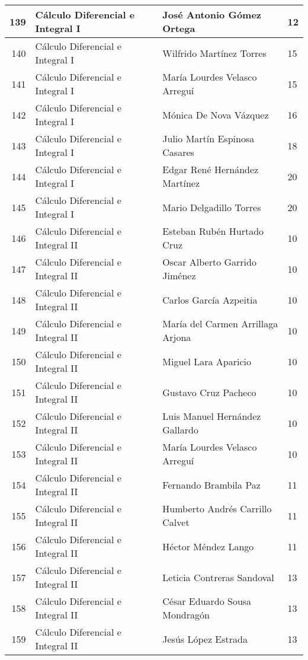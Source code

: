 \begin{table}[ht]
\begin{tabular}{rlll}
  139 & Cálculo Diferencial e Integral I & José Antonio Gómez Ortega & 12 \\ \hline
  140 & Cálculo Diferencial e Integral I & Wilfrido Martínez Torres & 15 \\ \hline
  141 & Cálculo Diferencial e Integral I & María Lourdes Velasco Arreguí & 15 \\ \hline
  142 & Cálculo Diferencial e Integral I & Mónica De Nova Vázquez & 16 \\ \hline
  143 & Cálculo Diferencial e Integral I & Julio Martín Espinosa Casares & 18 \\ \hline
  144 & Cálculo Diferencial e Integral I & Edgar René Hernández Martínez & 20 \\ \hline
  145 & Cálculo Diferencial e Integral I & Mario Delgadillo Torres & 20 \\ \hline
  146 & Cálculo Diferencial e Integral II & Esteban Rubén Hurtado Cruz & 10 \\ \hline
  147 & Cálculo Diferencial e Integral II & Oscar Alberto Garrido Jiménez & 10 \\ \hline
  148 & Cálculo Diferencial e Integral II & Carlos García Azpeitia & 10 \\ \hline
  149 & Cálculo Diferencial e Integral II & María del Carmen Arrillaga Arjona & 10 \\ \hline
  150 & Cálculo Diferencial e Integral II & Miguel Lara Aparicio & 10 \\ \hline
  151 & Cálculo Diferencial e Integral II & Gustavo Cruz Pacheco & 10 \\ \hline
  152 & Cálculo Diferencial e Integral II & Luis Manuel Hernández Gallardo & 10 \\ \hline
  153 & Cálculo Diferencial e Integral II & María Lourdes Velasco Arreguí & 10 \\ \hline
  154 & Cálculo Diferencial e Integral II & Fernando Brambila Paz & 11 \\ \hline
  155 & Cálculo Diferencial e Integral II & Humberto Andrés Carrillo Calvet & 11 \\ \hline
  156 & Cálculo Diferencial e Integral II & Héctor Méndez Lango & 11 \\ \hline
  157 & Cálculo Diferencial e Integral II & Leticia Contreras Sandoval & 13 \\ \hline
  158 & Cálculo Diferencial e Integral II & César Eduardo Sousa Mondragón & 13 \\ \hline
  159 & Cálculo Diferencial e Integral II & Jesús López Estrada & 13 \\ \hline

\end{tabular}
\end{table}
